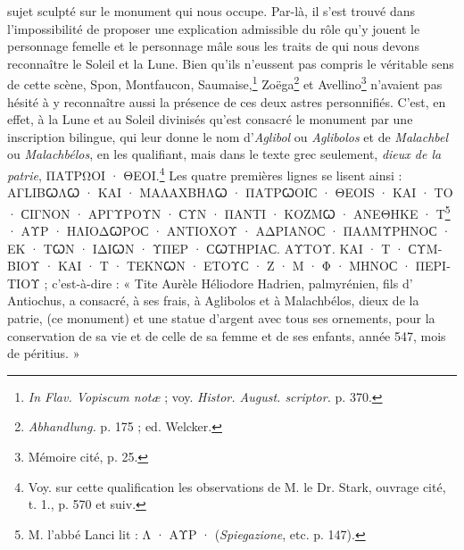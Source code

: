 \documentclass{article}
\begin{document}
sujet sculpté sur le monument qui nous occupe. Par-là, il s'est trouvé dans l'impossibilité de proposer une explication admissible du rôle qu'y jouent le personnage femelle et le personnage mâle sous les traits de qui nous devons reconnaître le Soleil et la Lune. Bien qu'ils n'eussent pas compris le véritable sens de cette scène, Spon, Montfaucon, Saumaise,\footnote{\emph{In Flav. Vopiscum notæ} ; voy. \emph{Histor. August. scriptor.} p. 370.} Zoëga\footnote{\emph{Abhandlung.} p. 175 ; ed. Welcker.} et Avellino\footnote{Mémoire cité, p. 25.} n'avaient pas hésité à y reconnaître aussi la présence de ces deux astres personnifiés. C'est, en effet, à la Lune et au Soleil divinisés qu'est consacré le monument par une inscription bilingue, qui leur donne le nom d'\emph{Aglibol} ou \emph{Aglibolos} et de \emph{Malachbel} ou \emph{Malachbélos}, en les qualifiant, mais dans le texte grec seulement, \emph{dieux de la patrie}, \textgreek{ΠΑΤΡΩΟΙ · ΘΕΟΙ}.\footnote{Voy. sur cette qualification les observations de M. le Dr. Stark, ouvrage cité, t. 1., p. 570 et suiv.} Les quatre premières lignes se lisent ainsi : \textgreek{ΑΓLΙΒꞶΛꞶ · ΚΑΙ · ΜΑΛΑΧΒΗΛꞶ · ΠΑΤΡꞶΟΙϹ · ΘΕΟΙS · ΚΑΙ · ΤΟ · ϹΙΓΝΟΝ · ΑΡΓΥΡΟΥΝ · ϹΥΝ · ΠΑΝΤΙ · ΚΟΖΜꞶ · ΑΝΕΘΗΚΕ · Τ}\footnote{M. l'abbé Lanci lit : \textgreek{Λ · ΑΥΡ ·} (\emph{Spiegazione}, etc. p. 147).} \textgreek{· ΑΥΡ · ΗΛΙΟΔꞶΡΟϹ · ΑΝΤΙΟΧΟΥ · ΑΔΡΙΑΝΟϹ · ΠΑΛΜΥΡΗΝΟϹ · ΕΚ · ΤꞶΝ · ΙΔΙꞶΝ · ΥΠΕΡ · ϹꞶΤΗΡΙΑϹ. ΑΥΤΟΥ. ΚΑΙ · Τ · ϹΥΜΒΙΟΥ · ΚΑΙ · Τ · ΤΕΚΝꞶΝ · ΕΤΟΥϹ · Ζ · Μ · Φ · ΜΗΝΟϹ · ΠΕΡΙΤΙΟΥ} ; c'est-à-dire : « Tite Aurèle Héliodore Hadrien, palmyrénien, fils d' Antiochus, a consacré, à ses frais, à Aglibolos et à Malachbélos, dieux de la patrie, (ce monument) et une statue d'argent avec tous ses ornements, pour la conservation de sa vie et de celle de sa femme et de ses enfants, année 547, mois de péritius. »
\end{document}
